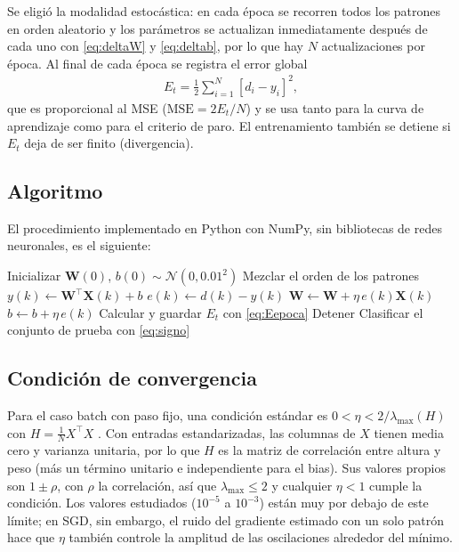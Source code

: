 \documentclass[conference]{IEEEtran}
\begin{document}
Se eligió la modalidad estocástica: en cada época se recorren todos los
patrones en orden aleatorio y los parámetros se actualizan inmediatamente
después de cada uno con \eqref{eq:deltaW} y \eqref{eq:deltab}, por lo que hay
$N$ actualizaciones por época. Al final de cada época se registra el error
global
\begin{align}
    \label{eq:Eepoca}
    E_t=\frac{1}{2}\sum_{i=1}^{N}\left[d_i-y_i\right]^2,
\end{align}
que es proporcional al MSE ($\text{MSE}=2E_t/N$) y se usa tanto para la
curva de aprendizaje como para el criterio de paro. El entrenamiento también
se detiene si $E_t$ deja de ser finito (divergencia).

\subsection{Algoritmo}
El procedimiento implementado en Python con NumPy, sin bibliotecas de redes
neuronales, es el siguiente:
\begin{algorithmic}[1]
\STATE Inicializar $\mathbf{W}(0)$, $b(0)\sim\mathcal{N}(0,0.01^2)$
    \STATE Mezclar el orden de los patrones
        \STATE $y(k)\leftarrow\mathbf{W}^\top\mathbf{X}(k)+b$
        \STATE $e(k)\leftarrow d(k)-y(k)$
        \STATE $\mathbf{W}\leftarrow\mathbf{W}+\eta\,e(k)\mathbf{X}(k)$
        \STATE $b\leftarrow b+\eta\,e(k)$
    \ENDFOR
    \STATE Calcular y guardar $E_t$ con \eqref{eq:Eepoca}
        \STATE Detener
    \ENDIF
\ENDFOR
\STATE Clasificar el conjunto de prueba con \eqref{eq:signo}
\end{algorithmic}

\subsection{Condición de convergencia}
Para el caso batch con paso fijo, una condición estándar es
$0<\eta<2/\lambda_{\max}(H)$ con $H=\frac{1}{N}X^\top X$ \cite{b4}. Con
entradas estandarizadas, las columnas de $X$ tienen media cero y varianza
unitaria, por lo que $H$ es la matriz de correlación entre altura y peso
(más un término unitario e independiente para el bias). Sus valores propios
son $1\pm\rho$, con $\rho$ la correlación, así que
$\lambda_{\max}\leq2$ y cualquier $\eta<1$ cumple la condición. Los valores
estudiados ($10^{-5}$ a $10^{-3}$) están muy por debajo de este límite; en
SGD, sin embargo, el ruido del gradiente estimado con un solo patrón hace que
$\eta$ también controle la amplitud de las oscilaciones alrededor del mínimo.
\end{document}

